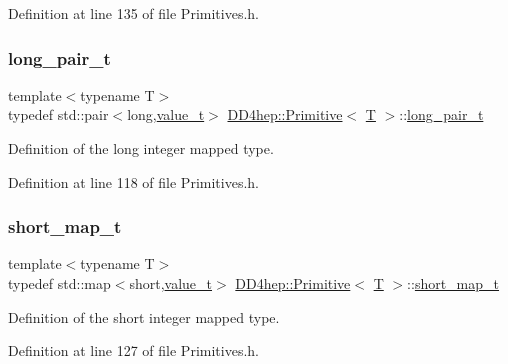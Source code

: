 Definition at line 135 of file Primitives.\+h.

\hypertarget{struct_d_d4hep_1_1_primitive_a9430e72efcdbc036b1878b578f75c696}{}\label{struct_d_d4hep_1_1_primitive_a9430e72efcdbc036b1878b578f75c696} 
\subsubsection{\texorpdfstring{long\+\_\+pair\+\_\+t}{long\_pair\_t}}
{\footnotesize\ttfamily template$<$typename T$>$ \\
typedef std\+::pair$<$long,\hyperlink{struct_d_d4hep_1_1_primitive_a0639e73bb8f07f99c2d8401f807a7af6}{value\+\_\+t}$>$ \hyperlink{struct_d_d4hep_1_1_primitive}{D\+D4hep\+::\+Primitive}$<$ \hyperlink{class_t}{T} $>$\+::\hyperlink{struct_d_d4hep_1_1_primitive_a9430e72efcdbc036b1878b578f75c696}{long\+\_\+pair\+\_\+t}}



Definition of the long integer mapped type. 



Definition at line 118 of file Primitives.\+h.

\hypertarget{struct_d_d4hep_1_1_primitive_ad899cb08d4a2d808891f5297600653ae}{}\label{struct_d_d4hep_1_1_primitive_ad899cb08d4a2d808891f5297600653ae} 
\subsubsection{\texorpdfstring{short\+\_\+map\+\_\+t}{short\_map\_t}}
{\footnotesize\ttfamily template$<$typename T$>$ \\
typedef std\+::map$<$short,\hyperlink{struct_d_d4hep_1_1_primitive_a0639e73bb8f07f99c2d8401f807a7af6}{value\+\_\+t}$>$ \hyperlink{struct_d_d4hep_1_1_primitive}{D\+D4hep\+::\+Primitive}$<$ \hyperlink{class_t}{T} $>$\+::\hyperlink{struct_d_d4hep_1_1_primitive_ad899cb08d4a2d808891f5297600653ae}{short\+\_\+map\+\_\+t}}



Definition of the short integer mapped type. 



Definition at line 127 of file Primitives.\+h.

